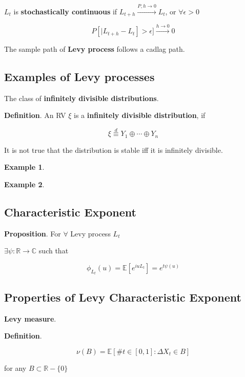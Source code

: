 \documentclass[12pt]{article}
\theoremstyle{nonumberbreak}
\begin{document}
$L_t$ is \textbf{stochastically continuous} if $L_{t+h} \overset{P,h\to 0}{\to} L_t$, or $\forall \epsilon >0$

$$
P [ | L_{t+h} - L_t] > \epsilon ] \overset{h\to0}{\to} 0
$$

The sample path of \textbf{Levy process} follows a cadlag path. 


\subsection{Examples of Levy processes}

The class of \textbf{infinitely divisible distributions}. 




\begin{theorem}
\textbf{Definition}. An RV $\xi$ is a \textbf{infinitely divisible distribution}, if 

$$
\xi \overset{d}{\equiv} Y_1 \oplus \cdots \oplus Y_n
$$

\end{theorem}


It is not true that the distribution is stable iff it is infinitely divisible. 




\textbf{Example 1}. 


\textbf{Example 2}. 


\subsection{Characteristic Exponent}



\begin{theorem}
\textbf{Proposition}. For $\forall$ Levy process $L_t$

$\exists \psi: \mathbb{R} \to \mathbb{C}$ such that

$$
\phi_{L_t} (u) = \mathbb{E} \left[ e^{iuL_t} \right] = e^{t \psi(u)}
$$

\end{theorem}

\subsection{Properties of Levy Characteristic Exponent}

\textbf{Levy measure}. 


\begin{theorem}
\textbf{Definition}. 

$$
\nu (B) = \mathbb{E} [\# t \in [0,1] : \Delta X_t \in B]
$$

for any $B \subset \mathbb{R} - \{ 0 \}$
\end{theorem}
\end{document}
